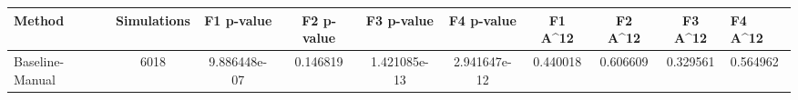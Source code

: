 \begin{tabular}{lcccccccc}
\toprule
         Method &  Simulations &   F1 p-value &  F2 p-value &   F3 p-value &   F4 p-value &  F1 A^12 &  F2 A^12 &  F3 A^12 &  F4 A^12 \\
\midrule
Baseline-Manual &         6018 & 9.886448e-07 &    0.146819 & 1.421085e-13 & 2.941647e-12 & 0.440018 & 0.606609 & 0.329561 & 0.564962 \\
\bottomrule
\end{tabular}
